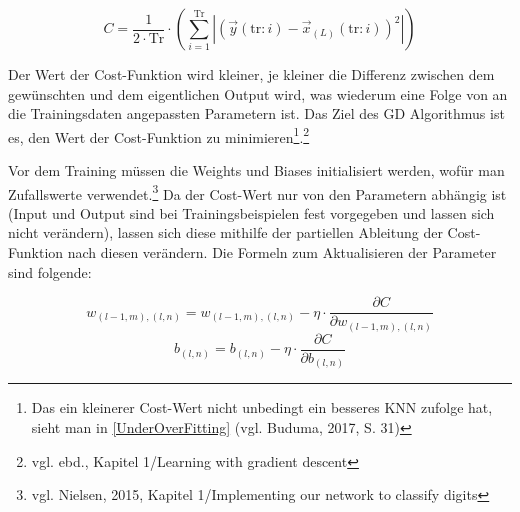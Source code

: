 \documentclass[
	a4paper,
	12pt,
	ngerman,
	oneside
]{scrreprt}											%
\newcommand{\fundamentals}[1]{vgl. Buduma, 2017, S. {#1}}
\begin{document}
			\begin{equation}\label{MSE}
				C = \frac{1}{2\cdot\textrm{Tr}} \cdot \left( \sum_{i=1}^{\textrm{Tr}} |(\vec{y}(\textrm{tr}:i) - \vec{x}_{(L)}(\textrm{tr}:i))^2| \right)
			\end{equation} 
	
	
			Der Wert der Cost-Funktion wird kleiner, je kleiner die Differenz zwischen dem gewünschten und dem eigentlichen Output wird, was wiederum eine Folge von an die Trainingsdaten angepassten Parametern ist. Das Ziel des GD Algorithmus ist es, den Wert der Cost-Funktion zu minimieren\footnote{Das ein kleinerer Cost-Wert nicht unbedingt ein besseres KNN zufolge hat, sieht man in \ref{UnderOverFitting} (\fundamentals{31})}.\footnote{vgl. ebd., Kapitel 1/Learning with gradient descent}
	
			Vor dem Training müssen die Weights und Biases initialisiert werden, wofür man Zufallswerte verwendet.\footnote{vgl. Nielsen, 2015, Kapitel 1/Implementing our network to classify digits} 
			Da der Cost-Wert nur von den Parametern abhängig ist (Input und Output sind bei Trainingsbeispielen fest vorgegeben und lassen sich nicht verändern), lassen sich diese mithilfe der partiellen Ableitung der Cost-Funktion nach diesen verändern. Die Formeln zum Aktualisieren der Parameter sind folgende:
	
			\begin{equation}\label{UpdateRuleWeights}
				w_{(l-1,m),(l,n)} = w_{(l-1,m),(l,n)} - \eta \cdot \frac{\partial C}{\partial w_{(l-1,m),(l,n)}}
			\end{equation}
			\begin{equation}\label{UpdateRuleBiases}
				b_{(l,n)} = b_{(l,n)} - \eta \cdot \frac{\partial C}{\partial b_{(l,n)}}
			\end{equation}
	
\end{document}
